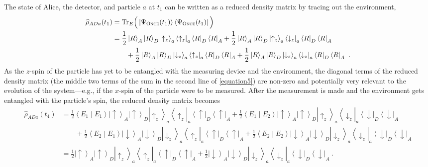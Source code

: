 \documentclass[onecolumn,secnumarabic,amsmath,amssymb,balancelastpage,nofootinbib]{article}
\newcommand{\bra}[1]{\ensuremath{\left\langle#1\right|}}
\newcommand{\ket}[1]{\ensuremath{\left|#1\right\rangle}}
\newcommand{\bracket}[2]{\ensuremath{\left\langle #1 \middle| #2 \right\rangle}}
\begin{document}
The state of Alice, the detector, and particle $a$ at $t_1$ can be written as a reduced density matrix by tracing out the environment,
\begin{align}
\widehat{\rho}_{ADa}(t_1)&=\text{Tr}_E\Big(\ket{\Psi_{\textsc{Once}}(t_1)}\bra{\Psi_{\textsc{Once}}(t_1)}\Big)
\nonumber
\\
&=\frac{1}{2}\ket{R}_A\ket{R}_{D}\ket{\uparrow_z}_a\bra{\uparrow_z}_a\bra{R}_{D}\bra{R}_A+\frac{1}{2}\ket{R}_A\ket{R}_{D}\ket{\uparrow_z}_a\bra{\downarrow_z}_a\bra{R}_{D}\bra{R}_A
\nonumber
\\
&\qquad +\frac{1}{2}\ket{R}_A\ket{R}_{D}\ket{\downarrow_z}_a\bra{\uparrow_z}_a\bra{R}_{D}\bra{R}_A+\frac{1}{2}\ket{R}_A\ket{R}_{D}\ket{\downarrow_z}_a\bra{\downarrow_z}_a\bra{R}_{D}\bra{R}_A\ .
\label{equation5}
\end{align}
As the $z$-spin of the particle has yet to be entangled with the measuring device and the environment, the diagonal terms of the reduced density matrix (the middle two terms of the sum in the second line of \eqref{equation5}) are non-zero and potentially very relevant to the evolution of the system---e.g., if the $x$-spin of the particle were to be measured.  After the measurement is made and the environment gets entangled with the particle's spin, the reduced density matrix becomes
\begin{align}
\widehat{\rho}_{ADa}(t_4)&=\frac{1}{2}\bracket{E_1}{E_1}\ket{\uparrow}_A\ket{\uparrow}_{D}\ket{\uparrow_z}_a\bra{\uparrow_z}_a\bra{\uparrow}_{D}\bra{\uparrow}_A+\frac{1}{2}\bracket{E_1}{E_2}\ket{\uparrow}_A\ket{\uparrow}_{D}\ket{\uparrow_z}_a\bra{\downarrow_z}_a\bra{\downarrow}_{D}\bra{\downarrow}_A
\nonumber
\\
&\qquad +\frac{1}{2}\bracket{E_2}{E_1}\ket{\downarrow}_A\ket{\downarrow}_{D}\ket{\downarrow_z}_a\bra{\uparrow_z}_a\bra{\uparrow}_{D}\bra{\uparrow}_A+\frac{1}{2}\bracket{E_2}{E_2}\ket{\downarrow}_A\ket{\downarrow}_{D}\ket{\downarrow_z}_a\bra{\downarrow_z}_a\bra{\downarrow}_{D}\bra{\downarrow}_A
\nonumber
\\
&=\frac{1}{2}\ket{\uparrow}_A\ket{\uparrow}_{D}\ket{\uparrow_z}_a\bra{\uparrow_z}_a\bra{\uparrow}_{D}\bra{\uparrow}_A+\frac{1}{2}\ket{\downarrow}_A\ket{\downarrow}_{D}\ket{\downarrow_z}_a\bra{\downarrow_z}_a\bra{\downarrow}_{D}\bra{\downarrow}_A
\ .
\label{redu}
\end{align}
\end{document}
